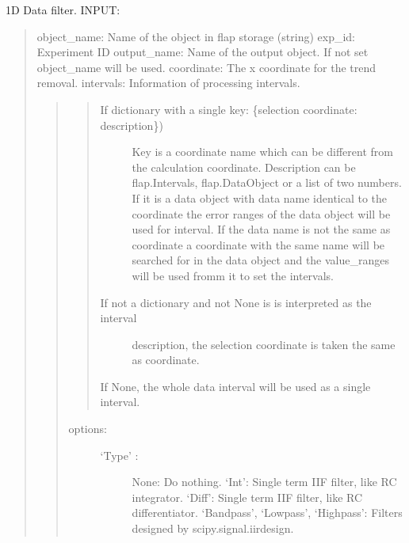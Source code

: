 \documentclass[letterpaper,10pt,english]{sphinxmanual}
\begin{document}
\begin{fulllineitems}
\label{\detokenize{data_object:flap.data_object.filter_data}}
1D Data filter.
INPUT:
\begin{quote}

object\_name: Name of the object in flap storage (string)
exp\_id: Experiment ID
output\_name: Name of the output object. If not set object\_name will be used.
coordinate: The x coordinate for the trend removal.
intervals: Information of processing intervals.
\begin{quote}
\begin{quote}
\begin{description}
\item[{If dictionary with a single key: \{selection coordinate: description\})}] \leavevmode
Key is a coordinate name which can be different from the calculation
coordinate.
Description can be flap.Intervals, flap.DataObject or
a list of two numbers. If it is a data object with data name identical to
the coordinate the error ranges of the data object will be used for
interval. If the data name is not the same as coordinate a coordinate with the
same name will be searched for in the data object and the value\_ranges
will be used fromm it to set the intervals.

\item[{If not a dictionary and not None is is interpreted as the interval}] \leavevmode
description, the selection coordinate is taken the same as
coordinate.

\end{description}

If None, the whole data interval will be used as a single interval.
\end{quote}
\begin{description}
\item[{options:}] \leavevmode\begin{description}
\item[{‘Type’ :}] \leavevmode
None: Do nothing.
‘Int’: Single term IIF filter, like RC integrator.
‘Diff’: Single term IIF filter, like RC differentiator.
‘Bandpass’, ‘Lowpass’, ‘Highpass’: Filters designed by scipy.signal.iirdesign.
\begin{quote}
\begin{quote}


\end{quote}
\end{quote}
\end{description}
\end{description}
\end{quote}
\end{quote}
\end{fulllineitems}
\end{document}
